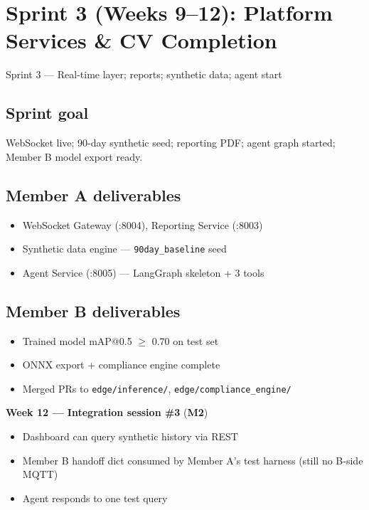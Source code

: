 \documentclass[12pt,a4paper]{article}
\begin{document}
\section{Sprint 3 (Weeks 9--12): Platform Services \& CV Completion}

\begin{sprintbox}{{Sprint 3 --- Real-time layer; reports; synthetic data; agent start}}

\subsection*{Sprint goal}
WebSocket live; 90-day synthetic seed; reporting PDF; agent graph started; Member B model export ready.

\subsection*{Member A deliverables}
\begin{itemize}
    \item WebSocket Gateway (:8004), Reporting Service (:8003)
    \item Synthetic data engine --- \texttt{90day\_baseline} seed
    \item Agent Service (:8005) --- LangGraph skeleton + 3 tools
\end{itemize}

\subsection*{Member B deliverables}
\begin{itemize}
    \item Trained model mAP@0.5 $\geq$ 0.70 on test set
    \item ONNX export + compliance engine complete
    \item Merged PRs to \texttt{edge/inference/}, \texttt{edge/compliance\_engine/}
\end{itemize}

\begin{collabbox}
\textbf{Week 12 --- Integration session \#3} (\textbf{M2})
\begin{itemize}
    \item Dashboard can query synthetic history via REST
    \item Member B handoff dict consumed by Member A's test harness (still no B-side MQTT)
    \item Agent responds to one test query
\end{itemize}
\end{collabbox}

\end{sprintbox}
\end{document}
